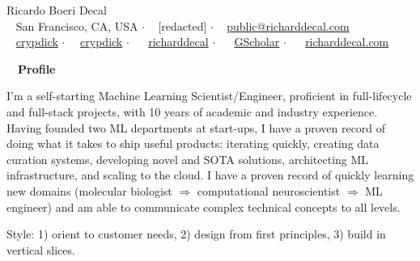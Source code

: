 \documentclass[a4paper,12pt]{article}
\newcommand{\resheading}[1]{{\hspace{-9pt} \colorbox{mygrey}{\begin{minipage}{\textwidth}{\textmd{~~\large \textbf{#1} \vphantom{p\^{E}}}}\end{minipage}}\vspace{6pt}} }
\begin{document}
    \begin{center}
    {\Huge Ricardo Boeri Decal}
        \\
        {\small \faMapMarker~ San Francisco, CA, USA $\cdot$ \faPhone~ [redacted] $\cdot$ \faEnvelope~ \href{mailto:public@richarddecal.com}{public@richarddecal.com}  \\ \faGithubAlt~ \href{https://github.com/crypdick}{crypdick} $\cdot$~\faStackOverflow~  \href{https://stackoverflow.com/users/4212158/crypdick}{crypdick} $\cdot$ ~\faLinkedin~ \href{https://www.linkedin.com/in/richarddecal/}{richarddecal} $\cdot$ ~\faGraduationCap~ \href{https://scholar.google.com/citations?user=4ODJ78oAAAAJ}{GScholar} $\cdot$ ~\faHome~  \href{https://www.richarddecal.com}{richarddecal.com}} 
    \end{center}

    \resheading{Profile}

    I'm a self-starting Machine Learning Scientist/Engineer, proficient in full-lifecycle and 
    full-stack projects, with 10 years of academic and industry experience.
    Having founded two ML departments at start-ups, I have a proven record of doing what 
    it takes to ship useful products: iterating quickly, creating data curation systems, developing 
    novel and SOTA solutions, architecting ML infrastructure, and scaling to the cloud. 
    I have a proven record of quickly learning new domains (molecular biologist $\Rightarrow$ computational neuroscientist $\Rightarrow$ ML engineer) and am able to communicate complex technical concepts to all levels.

    \vspace{0.5em} %

    Style: 1) orient to customer needs, 2) design from first principles, 3) build in vertical slices.\\
\end{document}
